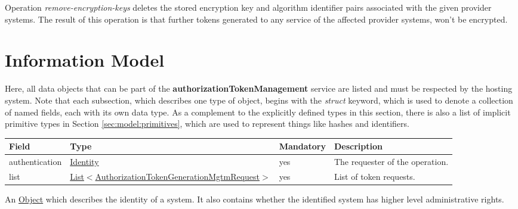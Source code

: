 \documentclass[a4paper]{arrowhead}
\newcommand{\pref}[1]{{\textcolor{ArrowheadGrey}{\hyperref[sec:model:primitives:#1]{#1}}}}
\begin{document}
Operation \textit{remove-encryption-keys} deletes the stored encryption key and algorithm identifier pairs associated with the given provider systems. The result of this operation is that further tokens generated to any service of the affected provider systems, won't be encrypted. 

\clearpage

\section{Information Model}
\label{sec:model}

Here, all data objects that can be part of the \textbf{authorizationTokenManagement} service are listed and must be respected by the hosting system.
Note that each subsection, which describes one type of object, begins with the \textit{struct} keyword, which is used to denote a collection of named fields, each with its own data type.
As a complement to the explicitly defined types in this section, there is also a list of implicit primitive types in Section \ref{sec:model:primitives}, which are used to represent things like hashes and identifiers.



\begin{table}[ht!]
\begin{tabularx}{\textwidth}{| p{3cm} | p{8cm} | p{2cm} | X |} \hline
\rowcolor{gray!33} Field & Type & Mandatory & Description \\ \hline
authentication & \hyperref[sec:model:Identity]{Identity} & yes & The requester of the operation. \\ \hline
list & \pref{List}$<$\hyperref[sec:model:AuthorizationTokenGenerationMgtmRequest]{AuthorizationTokenGenerationMgtmRequest}$>$ & yes & List of token requests. \\ \hline
\end{tabularx}
\end{table}


An \pref{Object} which describes the identity of a system. It also contains whether the identified system has higher level administrative rights.

\end{document}

